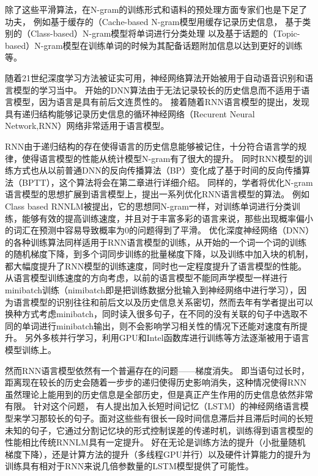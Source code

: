 除了这些平滑算法，在N-gram的训练形式和语料的预处理方面专家们也是下足了功夫，
例如基于缓存的（Cache-based N-gram模型用缓存记录历史信息\cite{kuhn1990cache}，
基于类别的（Class-based）N-gram模型将单词进行分类处理\cite{brown1992class}
以及基于话题的（Topic-based）N-gram模型在训练单词的时候为其配备话题附加信息以达到更好的训练等\cite{gildea1999topic}。

随着21世纪深度学习方法被证实可用，神经网络算法开始被用于自动语音识别和语言模型的学习当中。
开始的DNN算法由于无法记录较长的历史信息而不适用于语言模型，因为语言是具有前后文连贯性的。
接着随着RNN语言模型的提出，发现具有递归结构能够记录历史信息的循环神经网络（Recurent Neural Network,RNN）网络非常适用于语言模型。

RNN由于递归结构的存在使得语言的历史信息能够被记住，十分符合语言学的规律，使得语言模型的性能从统计模型N-gram有了很大的提升。
同时RNN模型的训练方式也从以前普通DNN的反向传播算法（BP）变化成了基于时间的反向传播算法（BPTT），这个算法将会在第二章进行详细介绍。
同样的，学者将优化N-gram语言模型的思想扩展到语言模型上，提出一系列优化RNN语言模型的算法。
例如Class based RNNLM被提出，它的思想同N-gram一样，对训练单词进行分类训练，能够有效的提高训练速度，并且对于丰富多彩的语言来说，那些出现概率偏小的词汇在预测中容易导致概率为0的问题得到了平滑。
优化深度神经网络（DNN）的各种训练算法同样适用于RNN语言模型的训练，从开始的一个词一个词的训练的随机梯度下降，到多个词同步训练的批量梯度下降，以及训练中加入块的机制，都大幅度提升了RNN模型的训练速度，同时也一定程度提升了语言模型的性能。
从语言模型训练速度的方向考虑，以前的语言模型不能同声学模型一样进行minibatch训练（nimibatch即是把训练数据分批输入到神经网络中进行学习），因为语言模型的识别往往和前后文以及历史信息关系密切，然而去年有学者提出可以换种方式考虑minibatch，同时读入很多句子，在不同的没有关联的句子中选取不同的单词进行minibatch输出，则不会影响学习相关性的情况下还能对速度有所提升。
另外多核并行学习，利用GPU和Intel函数库进行训练等方法逐渐被用于语言模型训练上。

然而RNN语言模型依然有一个普遍存在的问题——梯度消失。
即当语句过长时，距离现在较长的历史会随着一步步的递归使得历史影响消失，这种情况使得RNN虽然理论上能用到的历史信息是全部历史，但是真正产生作用的历史信息依然非常有限。
针对这个问题，
有人提出加入长短时间记忆（LSTM）的神经网络语言模型来学习那较长的句子。面对这些些有很长一段时间信息滞后并且滞后时间的长短未知的句子，它通过分割记忆块的形式控制误差的传递时机，训练得到语言模型的性能相比传统RNNLM具有一定提升。
好在无论是训练方法的提升（小批量随机梯度下降），还是计算方法的提升（多线程GPU并行）以及硬件计算能力的提升为训练具有相对于RNN来说几倍参数量的LSTM模型提供了可能性。

